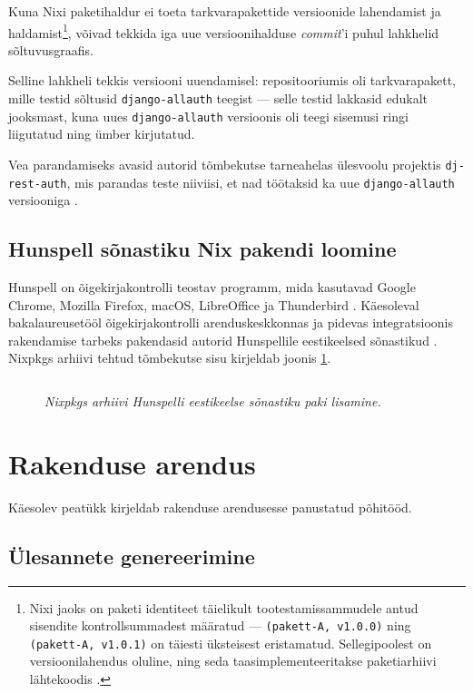 Kuna Nixi paketihaldur ei toeta tarkvarapakettide versioonide lahendamist ja haldamist\footnote{Nixi jaoks on paketi identiteet täielikult tootestamissammudele antud sisendite kontrollsummadest määratud \cite{nixos-how-nix-works} — \texttt{(pakett-A, v1.0.0)} ning \texttt{(pakett-A, v1.0.1)} on täiesti üksteisest eristamatud. Sellegipoolest on versioonilahendus oluline, ning seda taasimplementeeritakse paketiarhiivi lähtekoodis \cite{python3-nix-versioning}.}, võivad tekkida iga uue versioonihalduse \emph{commit}'i puhul lahkhelid sõltuvusgraafis.

Selline lahkheli tekkis versiooni uuendamisel: repositooriumis oli tarkvarapakett, mille testid sõltusid \texttt{django-allauth} teegist \cite{test-dep} — selle testid lakkasid edukalt jooksmast, kuna uues \texttt{django-allauth} versioonis oli teegi sisemusi ringi liigutatud ning ümber kirjutatud.

Vea parandamiseks avasid autorid tõmbekutse tarneahelas ülesvoolu projektis \texttt{dj-rest-auth}, mis parandas teste niiviisi, et nad töötaksid ka uue \texttt{django-allauth} versiooniga \cite{dj-rest-pr}.

\subsection{Hunspell sõnastiku Nix pakendi loomine}\label{subsec:hunspell}

Hunspell on õigekirjakontrolli teostav programm, mida kasutavad Google Chrome, Mozilla Firefox, macOS, LibreOffice ja Thunderbird \cite{hunspell}.
Käesoleval bakalaureusetööl õigekirjakontrolli arenduskeskkonnas ja pidevas integratsioonis rakendamise tarbeks pakendasid autorid Hunspellile eestikeelsed sõnastikud \cite{hunspell-pr}. Nixpkgs arhiivi tehtud tõmbekutse sisu kirjeldab joonis \ref{fig:hunspell-pr}.

\begin{figure}[H]
\inputminted[breaklines]{diff}{chapters/data/hunspell.diff}
\caption{\emph{Nixpkgs arhiivi Hunspelli eestikeelse sõnastiku paki lisamine.}}\label{fig:hunspell-pr}
\end{figure}

\section{Rakenduse arendus}

Käesolev peatükk kirjeldab rakenduse arendusesse panustatud põhitööd.

\subsection{Ülesannete genereerimine}

